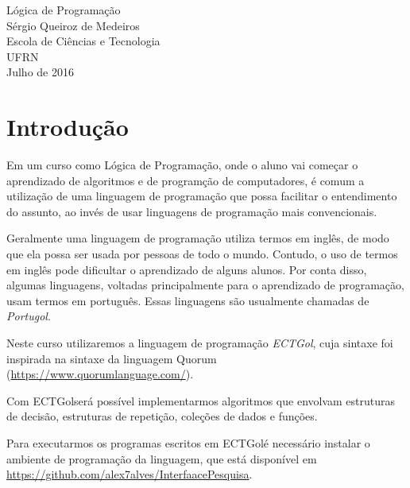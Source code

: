 \documentclass{report}
\newcommand{\Egol}{ECTGol}
\begin{document}
\thispagestyle{empty}
\begin{center}

\begin{center}
\end{center}
\vspace{6cm}
\Huge{Lógica de Programação}\\
\vspace{1.5cm}
\Large{Sérgio Queiroz de Medeiros} \\
\Large{Escola de Ciências e Tecnologia} \\
\Large{UFRN}
\vspace{5cm}
\\
\large{Julho de 2016}
\end{center}

\tableofcontents

\pagebreak




\chapter{Introdução}

Em um curso como Lógica de Programação, onde o aluno
vai começar o aprendizado de algoritmos e de programção
de computadores, é comum a utilização de uma linguagem
de programação que possa facilitar o entendimento do
assunto, ao invés de usar linguagens de programação
mais convencionais.

Geralmente uma linguagem de programação utiliza termos em inglês,
de modo que ela possa ser usada por pessoas de todo o mundo.
Contudo, o uso de termos em inglês pode dificultar o aprendizado
de alguns alunos. Por conta disso, algumas linguagens, voltadas
principalmente para o aprendizado de programação, usam termos em
português. Essas linguagens são usualmente chamadas de \emph{Portugol}.

Neste curso utilizaremos a linguagem de programação \emph{\Egol},
cuja sintaxe foi inspirada na sintaxe da linguagem Quorum
(\url{https://www.quorumlanguage.com/}).

Com \Egol será possível implementarmos algoritmos que envolvam
estruturas de decisão, estruturas de repetição, coleções de dados
e funções.

Para executarmos os programas escritos em \Egol é necessário
instalar o ambiente de programação da linguagem, que está disponível em
\url{https://github.com/alex7alves/InterfaacePesquisa}.
\end{document}
